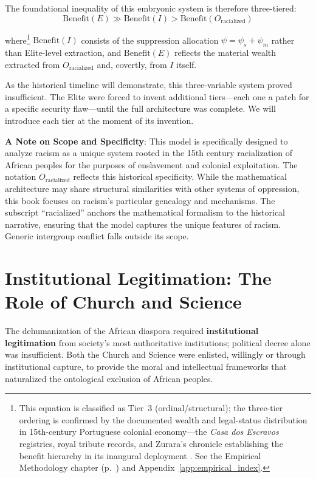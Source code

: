 The foundational inequality of this embryonic system is therefore three-tiered:
\begin{equation}\label{eq:2.7-three-tier-portugal-inequality}
\text{Benefit}(E) \gg \text{Benefit}(I) > \text{Benefit}(O_{\text{racialized}})
\end{equation}

where\footnote{This equation is classified as Tier~3 (ordinal/structural); the three-tier ordering is confirmed by the documented wealth and legal-status distribution in 15th-century Portuguese colonial economy---the \textit{Casa dos Escravos} registries, royal tribute records, and Zurara's chronicle establishing the benefit hierarchy in its inaugural deployment \cite{zurara}. See the Empirical Methodology chapter (p.~\pageref{ch:empirical_methodology}) and Appendix~\ref{app:empirical_index}.} $\text{Benefit}(I)$ consists of the suppression allocation $\psi = \psi_s + \psi_m$ rather than Elite-level extraction, and $\text{Benefit}(E)$ reflects the material wealth extracted from $O_{\text{racialized}}$ and, covertly, from $I$ itself.

As the historical timeline will demonstrate, this three-variable system proved insufficient. The Elite were forced to invent additional tiers---each one a patch for a specific security flaw---until the full architecture was complete. We will introduce each tier at the moment of its invention.

\textbf{A Note on Scope and Specificity}: This model is specifically designed to analyze racism as a unique system rooted in the 15th century racialization of African peoples for the purposes of enslavement and colonial exploitation. The notation $O_{\text{racialized}}$ reflects this historical specificity. While the mathematical architecture may share structural similarities with other systems of oppression, this book focuses on racism's particular genealogy and mechanisms. The subscript ``racialized'' anchors the mathematical formalism to the historical narrative, ensuring that the model captures the unique features of racism. Generic intergroup conflict falls outside its scope.

\section{Institutional Legitimation: The Role of Church and Science}

The dehumanization of the African diaspora required \textbf{institutional legitimation} from society's most authoritative institutions; political decree alone was insufficient. Both the Church and Science were enlisted, willingly or through institutional capture, to provide the moral and intellectual frameworks that naturalized the ontological exclusion of African peoples.

